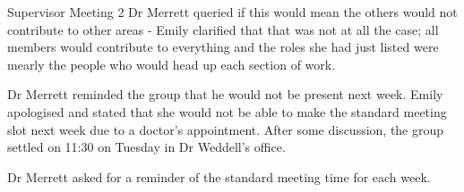 \documentclass{article}
\begin{document}
\begin{Minutes}{Supervisor Meeting 2}
Dr Merrett queried if this would mean the others would not contribute to other areas - Emily
clarified that that was not at all the case; all members would contribute to everything and
the roles she had just listed were mearly the people who would head up each section of work.

Dr Merrett reminded the group that he would not be present next week. Emily apologised and
stated that she would not be able to make the standard meeting slot next week due to a
doctor's appointment. After some discussion, the group settled on 11:30 on Tuesday in
Dr Weddell's office.

Dr Merrett asked for a reminder of the standard meeting time for each week.


\end{Minutes}
\end{document}
